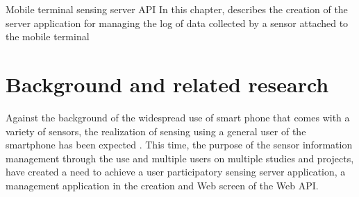 \chapterhead
{Mobile terminal sensing server API}
{In this chapter, describes the creation of the server application for managing the log of data collected by a sensor attached to the mobile terminal}


\section{Background and related research}
Against the background of the widespread use of smart phone that comes with a variety of sensors, the realization of sensing using a general user of the smartphone has been expected \cite{usersencing}.
This time, the purpose of the sensor information management through the use and multiple users on multiple studies and projects, have created a need to achieve a user participatory sensing server application, a management application in the creation and Web screen of the Web API.

